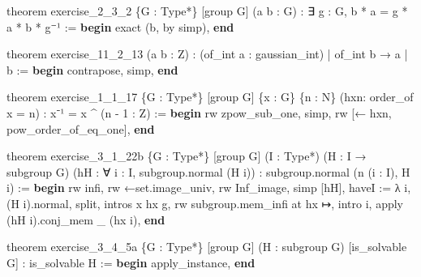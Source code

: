 \documentclass[
]{article}
\newenvironment{Shaded}{}{}
\newcommand{\ControlFlowTok}[1]{\textcolor[rgb]{0.00,0.44,0.13}{\textbf{#1}}}
\newcommand{\DataTypeTok}[1]{\textcolor[rgb]{0.56,0.13,0.00}{#1}}
\newcommand{\FloatTok}[1]{\textcolor[rgb]{0.25,0.63,0.44}{#1}}
\newcommand{\NormalTok}[1]{#1}
\newcommand{\OperatorTok}[1]{\textcolor[rgb]{0.40,0.40,0.40}{#1}}
\begin{document}
\begin{Shaded}
\begin{Highlighting}[]
\NormalTok{theorem exercise\_2\_3\_2 \{G }\OperatorTok{:} \DataTypeTok{Type}\OperatorTok{*}\NormalTok{\} [group G] (a b }\OperatorTok{:}\NormalTok{ G) }\OperatorTok{:}
\NormalTok{    ∃ g }\OperatorTok{:}\NormalTok{ G, b }\OperatorTok{*}\NormalTok{ a }\OperatorTok{=}\NormalTok{ g }\OperatorTok{*}\NormalTok{ a }\OperatorTok{*}\NormalTok{ b }\OperatorTok{*}\NormalTok{ g⁻¹ }\OperatorTok{:=}
\ControlFlowTok{begin}
\NormalTok{    exact (b, by simp),}
\ControlFlowTok{end}

\NormalTok{theorem exercise\_11\_2\_13 (a b }\OperatorTok{:}\NormalTok{ Z) }\OperatorTok{:}
\NormalTok{    (of\_int a }\OperatorTok{:}\NormalTok{ gaussian\_int) }\OperatorTok{|}\NormalTok{ of\_int b }\OperatorTok{→}\NormalTok{ a }\OperatorTok{|}\NormalTok{ b }\OperatorTok{:=}
\ControlFlowTok{begin}
\NormalTok{    contrapose,}
\NormalTok{    simp,}
\ControlFlowTok{end}

\NormalTok{theorem exercise\_1\_1\_17 \{G }\OperatorTok{:} \DataTypeTok{Type}\OperatorTok{*}\NormalTok{\} [group G] \{x }\OperatorTok{:}\NormalTok{ G\} \{n }\OperatorTok{:}\NormalTok{ N\}}
\NormalTok{    (hxn}\OperatorTok{:}\NormalTok{ order\_of x }\OperatorTok{=}\NormalTok{ n) }\OperatorTok{:}
\NormalTok{    x⁻¹ }\OperatorTok{=}\NormalTok{ x }\OperatorTok{\^{}}\NormalTok{ (n }\OperatorTok{{-}} \FloatTok{1} \OperatorTok{:}\NormalTok{ Z) }\OperatorTok{:=}
\ControlFlowTok{begin}
\NormalTok{    rw zpow\_sub\_one,}
\NormalTok{    simp,}
\NormalTok{    rw [}\OperatorTok{←}\NormalTok{ hxn, pow\_order\_of\_eq\_one],}
\ControlFlowTok{end}

\NormalTok{theorem exercise\_3\_1\_22b \{G }\OperatorTok{:} \DataTypeTok{Type}\OperatorTok{*}\NormalTok{\} [group G] (I }\OperatorTok{:} \DataTypeTok{Type}\OperatorTok{*}\NormalTok{)}
\NormalTok{    (H }\OperatorTok{:}\NormalTok{ I }\OperatorTok{→}\NormalTok{ subgroup G) (hH }\OperatorTok{:}\NormalTok{ ∀ i }\OperatorTok{:}\NormalTok{ I, subgroup.normal (H i)) }\OperatorTok{:}
\NormalTok{    subgroup.normal (n (i }\OperatorTok{:}\NormalTok{ I), H i) }\OperatorTok{:=}
\ControlFlowTok{begin}
\NormalTok{    rw infi,}
\NormalTok{    rw }\OperatorTok{←}\NormalTok{set.image\_univ,}
\NormalTok{    rw Inf\_image,}
\NormalTok{    simp [hH],}
\NormalTok{    haveI }\OperatorTok{:=}\NormalTok{ λ i, (H i).normal,}
\NormalTok{    split,}
\NormalTok{    intros x hx g,}
\NormalTok{    rw subgroup.mem\_infi at hx }\OperatorTok{↦}\NormalTok{,}
\NormalTok{    intro i,}
\NormalTok{    apply (hH i).conj\_mem \_ (hx i),}
\ControlFlowTok{end}

\NormalTok{theorem exercise\_3\_4\_5a \{G }\OperatorTok{:} \DataTypeTok{Type}\OperatorTok{*}\NormalTok{\} [group G]}
\NormalTok{    (H }\OperatorTok{:}\NormalTok{ subgroup G) [is\_solvable G] }\OperatorTok{:}\NormalTok{ is\_solvable H }\OperatorTok{:=}
\ControlFlowTok{begin}
\NormalTok{    apply\_instance,}
\ControlFlowTok{end} 
\end{Highlighting}
\end{Shaded}
\end{document}
